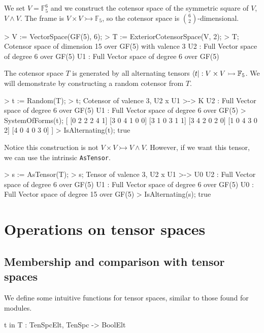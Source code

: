 \begin{example}[StandardCoTenSubspcs]

We set $V=\mathbb{F}_5^6$ and we construct the cotensor space of the symmetric
square of $V$, $V\wedge V$. The frame is $V\times V\rightarrowtail
\mathbb{F}_5$, so the cotensor space is $\binom{6}{2}$-dimensional. 
\begin{code}
> V := VectorSpace(GF(5), 6);
> T := ExteriorCotensorSpace(V, 2);
> T;
Cotensor space of dimension 15 over GF(5) with valence 3
U2 : Full Vector space of degree 6 over GF(5)
U1 : Full Vector space of degree 6 over GF(5)
\end{code}

The cotensor space $T$ is generated by all alternating tensors $\langle t| :
V\times V\rightarrowtail \mathbb{F}_5$. We will demonstrate by constructing a
random cotensor from $T$. 
\begin{code}
> t := Random(T);
> t;
Cotensor of valence 3, U2 x U1 >-> K
U2 : Full Vector space of degree 6 over GF(5)
U1 : Full Vector space of degree 6 over GF(5)
> SystemOfForms(t);
[
    [0 2 2 2 4 1]
    [3 0 4 1 0 0]
    [3 1 0 3 1 1]
    [3 4 2 0 2 0]
    [1 0 4 3 0 2]
    [4 0 4 0 3 0]
]
> IsAlternating(t);
true
\end{code}

Notice this construction is not $V\times V\rightarrowtail V\wedge V$. 
However, if we want this tensor, we can use the intrinsic \texttt{AsTensor}.
\begin{code}
> s := AsTensor(T);
> s;
Tensor of valence 3, U2 x U1 >-> U0
U2 : Full Vector space of degree 6 over GF(5)
U1 : Full Vector space of degree 6 over GF(5)
U0 : Full Vector space of degree 15 over GF(5)
> IsAlternating(s);
true
\end{code}
\end{example}


\section{Operations on tensor spaces}

\subsection{Membership and comparison with tensor spaces}

We define some intuitive functions for tensor spaces, similar to those found for modules.

\begin{intrinsics}
t in T : TenSpcElt, TenSpc -> BoolElt
\end{intrinsics}

